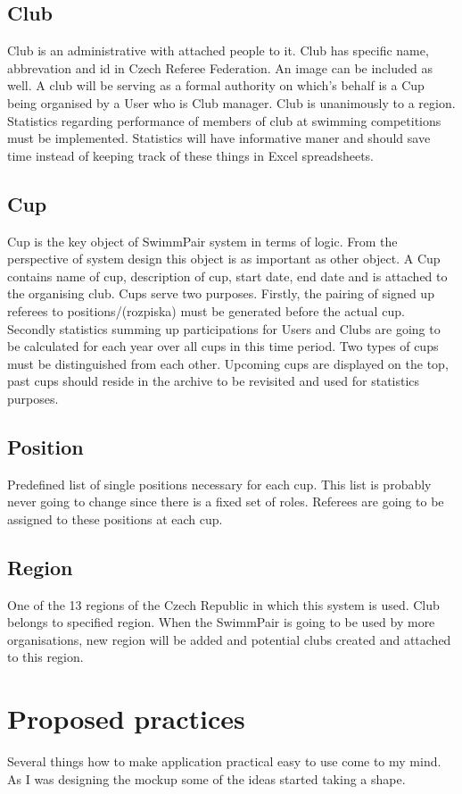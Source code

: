 \subsection*{Club}
\par
Club is an administrative with attached people to it. Club has specific name, abbrevation and id in Czech Referee Federation. An image can be included as well. A club will be serving as a formal authority on which's behalf is a Cup being organised by a User who is Club manager. Club is unanimously to a region. Statistics regarding performance of members of club at swimming competitions must be implemented. Statistics will have informative maner and should save time instead of keeping track of these things in Excel spreadsheets. 
\subsection*{Cup}
Cup is the key object of SwimmPair system in terms of logic. From the perspective of system design this object is as important as other object. A Cup contains name of cup, description of cup, start date, end date and is attached to the organising club. Cups serve two purposes. Firstly, the pairing of signed up referees to positions/(rozpiska) must be generated before the actual cup. Secondly statistics summing up participations for Users and Clubs are going to be calculated for each year over all cups in this time period. Two types of cups must be distinguished from each other. Upcoming cups are displayed on the top, past cups should reside in the archive to be revisited and used for statistics purposes.
\subsection*{Position}
Predefined list of single positions necessary for each cup. This list is probably never going to change since there is a fixed set of roles. Referees are going to be assigned to these positions at each cup.
\subsection*{Region}
One of the 13 regions of the Czech Republic in which this system is used. Club belongs to specified region. When the SwimmPair is going to be used by more organisations, new region will be added and potential clubs created and attached to this region. 
\section{Proposed practices}
Several things how to make application practical easy to use come to my mind. As I was designing the mockup some of the ideas started taking a shape.
